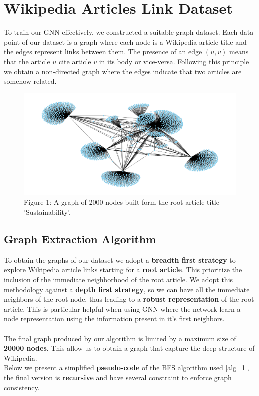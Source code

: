 \documentclass[11pt]{article}
\begin{document}
	\section{Wikipedia Articles Link Dataset}
	To train our GNN effectively, we constructed a suitable graph dataset.
	Each data point of our dataset is a graph where each node is a Wikipedia article title and the edges represent links between them. The presence of an edge $(u, v)$ means that the article $u$ cite article $v$ in its body or vice-versa.
	Following this principle we obtain a non-directed graph where the edges indicate that two articles are somehow related.
	\begin{figure}[h] %
		\centering
		\includegraphics[width=1\textwidth]{images/wiki_link_grap_2k.png}
		\caption{Figure 1: A graph of 2000 nodes built form the root article title 'Sustainability'.}
	\end{figure}
	
	\subsection{Graph Extraction Algorithm}
	To obtain the graphs of our dataset we adopt a \textbf{breadth first strategy} to explore Wikipedia article links starting for a \textbf{root article}. This prioritize the inclusion of the immediate neighborhood of the root article.
	We adopt this methodology against a \textbf{depth first strategy}, so we can have all the immediate neighbors of the root node, thus leading to a \textbf{robust representation} of the root article.
	This is particular helpful when using GNN where the network learn a node representation using the information present in it's first neighbors.\\\\
	The final graph produced by our algorithm is limited by a maximum size of \textbf{20000 nodes}. This allow us to obtain a graph that capture the deep structure of Wikipedia. \\
	Below we present a simplified \textbf{pseudo-code} of the BFS algorithm used \ref{alg_1}, the final version is \textbf{recursive} and have several constraint to enforce graph consistency. 
	
\end{document}
